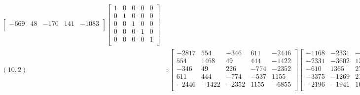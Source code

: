 \documentclass[12pt]{amsart}
\theoremstyle{plain}
\theoremstyle{definition}
\begin{document}
\begin{landscape}
\begin{align*}
\begin{bmatrix}
 -669  &   48  &   -170  &   141  &   -1083  \\ 
\end{bmatrix}
\begin{bmatrix}
1  &   0  &   0  &   0  &   0  \\ 
 0  &   1  &   0  &   0  &   0  \\ 
 0  &   0  &   1  &   0  &   0  \\ 
 0  &   0  &   0  &   1  &   0  \\ 
 0  &   0  &   0  &   0  &   1  \\ 
\end{bmatrix}
\\
(10,2) &:
\begin{bmatrix}
-2817  &   554  &   -346  &   611  &   -2446  \\ 
 554  &   1468  &   49  &   444  &   -1422  \\ 
 -346  &   49  &   226  &   -774  &   -2352  \\ 
 611  &   444  &   -774  &   -537  &   1155  \\ 
 -2446  &   -1422  &   -2352  &   1155  &   -6855  \\ 
\end{bmatrix}
\begin{bmatrix}
-1168  &   -2331  &   -610  &   -3375  &   -2196  \\ 
 -2331  &   -3602  &   1365  &   -1269  &   -1941  \\ 
 -610  &   1365  &   2773  &   2195  &   1640  \\ 
 -3375  &   -1269  &   2195  &   5047  &   2251  \\ 
 -2196  &   -1941  &   1640  &   2251  &   -1238  \\ 
\end{bmatrix}
\begin{bmatrix}
-408  &   -256  &   -1751  &   -83  &   283  \\ 
 -256  &   908  &   -698  &   1058  &   -1856  \\ 
 -1751  &   -698  &   -3348  &   -1866  &   -1251  \\ 
 -83  &   1058  &   -1866  &   -2054  &   966  \\ 
 283  &   -1856  &   -1251  &   966  &   -4067  \\ 
\end{bmatrix}
\begin{bmatrix}
-32  &   -174  &   379  &   1  &   -179  \\ 
 -174  &   -1817  &   -690  &   -374  &   1102  \\ 

\end{bmatrix}
\end{align*}
\end{landscape}
\end{document}
